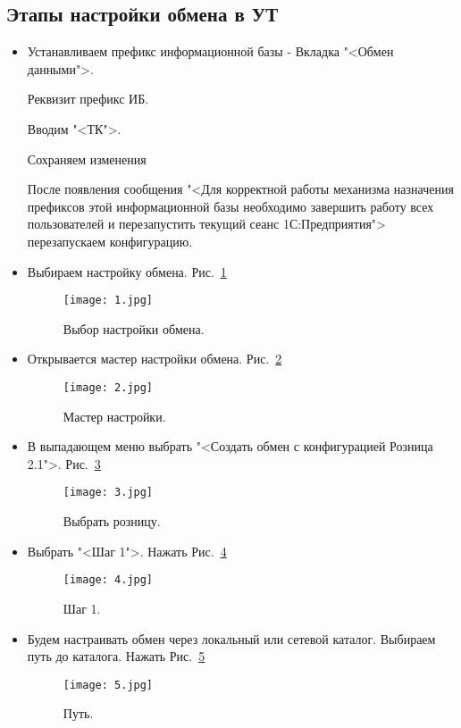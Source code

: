 \subsection{Этапы настройки обмена в УТ}
\begin{itemize}	
	\item Устанавливаем префикс информационной базы -
	Вкладка "<Обмен данными">.\par
	Реквизит префикс ИБ.\par
	Вводим "<ТК">.\par
	Сохраняем изменения 
	
	После появления сообщения "<Для корректной работы механизма назначения префиксов этой информационной базы 
	необходимо завершить работу всех пользователей и перезапустить текущий сеанс 1С:Предприятия"> перезапускаем конфигурацию.
	
	\item Выбираем настройку обмена.
	 Рис.~\ref{ris:1.jpg}	
	\begin{figure}[H]
		\texttt{[image: 1.jpg]}
		\caption{Выбор настройки обмена.}
		\label{ris:1.jpg}
	\end{figure}
	\item Открывается мастер настройки обмена.
	Рис.~\ref{ris:2.jpg}	
	\begin{figure}[H]
		\texttt{[image: 2.jpg]}
		\caption{Мастер настройки.}
		\label{ris:2.jpg}
	\end{figure}
	
	\item В выпадающем меню выбрать "<Создать обмен с конфигурацией Розница 2.1">.
	Рис.~\ref{ris:3.jpg}	
	\begin{figure}[H]
		\texttt{[image: 3.jpg]}
		\caption{Выбрать розницу.}
		\label{ris:3.jpg}
	\end{figure}


	\item Выбрать "<Шаг 1">.
	Нажать 
	Рис.~\ref{ris:4.jpg}	
	\begin{figure}[H]
		\texttt{[image: 4.jpg]}
		\caption{Шаг 1.}
		\label{ris:4.jpg}
	\end{figure}

	\item Будем настраивать обмен через локальный или сетевой каталог. Выбираем путь до каталога.
	Нажать 
	Рис.~\ref{ris:5.jpg}	
	\begin{figure}[H]
		\texttt{[image: 5.jpg]}
		\caption{Путь.}
		\label{ris:5.jpg}
	\end{figure}


\end{itemize}
